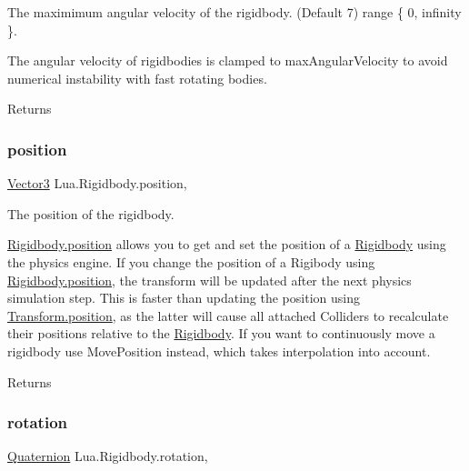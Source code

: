 The maximimum angular velocity of the rigidbody. (Default 7) range \{ 0, infinity \}. 

The angular velocity of rigidbodies is clamped to max\+Angular\+Velocity to avoid numerical instability with fast rotating bodies. \begin{DoxyReturn}{Returns}

\end{DoxyReturn}
\mbox{\label{class_lua_1_1_rigidbody_a9bef020808bd389b43ac5d2f7d429dc9}} 
\subsubsection{\texorpdfstring{position}{position}}
{\footnotesize\ttfamily \mbox{\hyperlink{class_lua_1_1_vector3}{Vector3}} Lua.\+Rigidbody.\+position\hspace{0.3cm}{\ttfamily [get]}, {\ttfamily [set]}}



The position of the rigidbody. 

\mbox{\hyperlink{class_lua_1_1_rigidbody_a9bef020808bd389b43ac5d2f7d429dc9}{Rigidbody.\+position}} allows you to get and set the position of a \mbox{\hyperlink{class_lua_1_1_rigidbody}{Rigidbody}} using the physics engine. If you change the position of a Rigibody using \mbox{\hyperlink{class_lua_1_1_rigidbody_a9bef020808bd389b43ac5d2f7d429dc9}{Rigidbody.\+position}}, the transform will be updated after the next physics simulation step. This is faster than updating the position using \mbox{\hyperlink{class_lua_1_1_transform_a789b6abed611a7576ca2262bb9c5e6c3}{Transform.\+position}}, as the latter will cause all attached Colliders to recalculate their positions relative to the \mbox{\hyperlink{class_lua_1_1_rigidbody}{Rigidbody}}. If you want to continuously move a rigidbody use Move\+Position instead, which takes interpolation into account. \begin{DoxyReturn}{Returns}

\end{DoxyReturn}
\mbox{\label{class_lua_1_1_rigidbody_a6cb1207363fce98ec04cacf8c6f776cc}} 
\subsubsection{\texorpdfstring{rotation}{rotation}}
{\footnotesize\ttfamily \mbox{\hyperlink{class_lua_1_1_quaternion}{Quaternion}} Lua.\+Rigidbody.\+rotation\hspace{0.3cm}{\ttfamily [get]}, {\ttfamily [set]}}




